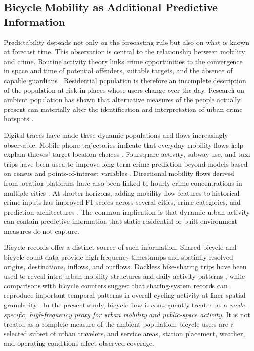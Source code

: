 \documentclass[applsci,article,submit,moreauthors]{Definitions/mdpi}
\begin{document}
\subsection{Bicycle Mobility as Additional Predictive Information}
\label{subsec:intro_bicycle_information}

Predictability depends not only on the forecasting rule but also on what is
known at forecast time. This observation is central to the relationship
between mobility and crime. Routine activity theory links crime
opportunities to the convergence in space and time of potential offenders,
suitable targets, and the absence of capable guardians
\citep{cohen1979routine}. Residential population is therefore an incomplete
description of the population at risk in places whose users change over the
day. Research on ambient population has shown that alternative measures of
the people actually present can materially alter the identification and
interpretation of urban crime hotspots \citep{malleson2016ambient}.

Digital traces have made these dynamic populations and flows increasingly
observable. Mobile-phone trajectories indicate that everyday mobility flows
help explain thieves' target-location choices \citep{song2019legal}.
Foursquare activity, subway use, and taxi trips have been used to improve
long-term crime prediction beyond models based on census and
points-of-interest variables \citep{kadar2018mining}. Directional mobility
flows derived from location platforms have also been linked to hourly crime
concentrations in multiple cities \citep{kadar2020mobility}. At shorter
horizons, adding mobility-flow features to historical crime inputs has
improved F1 scores across several cities, crime categories, and prediction
architectures \citep{wu2022mobility}. The common implication is that dynamic
urban activity can contain predictive information that static residential
or built-environment measures do not capture.

Bicycle records offer a distinct source of such information. Shared-bicycle
and bicycle-count data provide high-frequency timestamps and spatially
resolved origins, destinations, inflows, and outflows. Dockless bike-sharing
trips have been used to reveal intra-urban mobility structures and daily
activity patterns \citep{xu2023bike}, while comparisons with bicycle
counters suggest that sharing-system records can reproduce important
temporal patterns in overall cycling activity at finer spatial granularity
\citep{ivanovic2023bike}. In the present study, bicycle flow is consequently
treated as a \emph{mode-specific, high-frequency proxy for urban mobility
and public-space activity}. It is not treated as a complete measure of the
ambient population: bicycle users are a selected subset of urban travelers,
and service areas, station placement, weather, and operating conditions
affect observed coverage.
\end{document}
